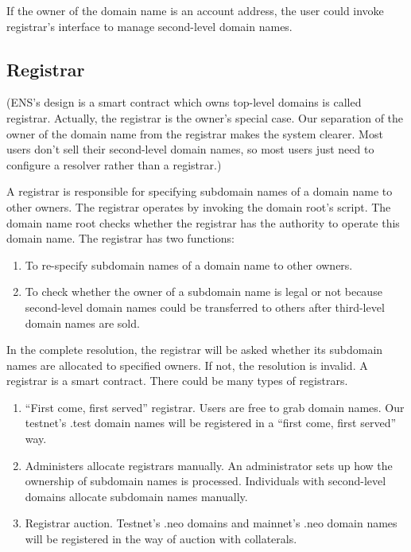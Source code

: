 \documentclass[letterpaper,10pt,english]{sphinxmanual}
\begin{document}
If the owner of the domain name is an account address, the user could invoke registrar’s interface to manage second-level domain names.


\subsection{Registrar}
\label{\detokenize{nns_system:registrar}}
(ENS’s design is a smart contract which owns top-level domains is called registrar. Actually, the registrar is the owner’s special case.
Our separation of the owner of the domain name from the registrar makes the system clearer. Most users don’t sell their second-level domain names,
so most users just need to configure a resolver rather than a registrar.)

A registrar is responsible for specifying subdomain names of a domain name to other owners.
The registrar operates by invoking the domain root’s script. The domain name root checks whether the registrar has the authority to operate this domain name.
The registrar has two functions:
\begin{enumerate}
\item {} 
To re-specify subdomain names of a domain name to other owners.

\item {} 
To check whether the owner of a subdomain name is legal or not because second-level domain names could be transferred to others after third-level domain names are sold.

\end{enumerate}

In the complete resolution, the registrar will be asked whether its subdomain names are allocated to specified owners. If not, the resolution is invalid.
A registrar is a smart contract. There could be many types of registrars.
\begin{enumerate}
\item {} 
“First come, first served” registrar. Users are free to grab domain names. Our testnet’s .test domain names will be registered in a “first come, first served” way.

\item {} 
Administers allocate registrars manually. An administrator sets up how the ownership of subdomain names is processed. Individuals with second-level domains allocate subdomain names manually.

\item {} 
Registrar auction. Testnet’s .neo domains and mainnet’s .neo domain names will be registered in the way of auction with collaterals.

\end{enumerate}
\end{document}
